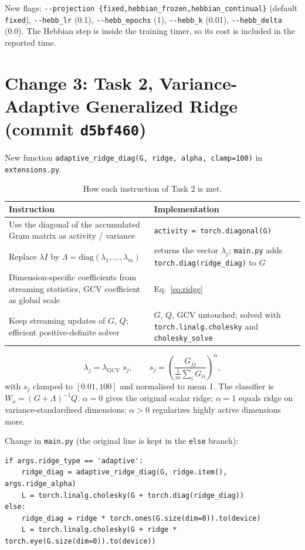 \documentclass[11pt,a4paper]{article}
\begin{document}
New flags: \texttt{-{}-projection \{fixed,hebbian\_frozen,hebbian\_continual\}} (default \texttt{fixed}),
\texttt{-{}-hebb\_lr} (0.1), \texttt{-{}-hebb\_epochs} (1), \texttt{-{}-hebb\_k} (0.01),
\texttt{-{}-hebb\_delta} (0.0).
The Hebbian step is inside the training timer, so its cost is included in the reported time.

\section{Change 3: Task 2, Variance-Adaptive Generalized Ridge (commit \texttt{d5bf460})}

New function \texttt{adaptive\_ridge\_diag(G, ridge, alpha, clamp=100)} in \texttt{extensions.py}.

\begin{table}[h]
\centering
\caption{How each instruction of Task 2 is met.}
\begin{tabularx}{\textwidth}{LL}
\toprule
Instruction & Implementation \\
\midrule
Use the diagonal of the accumulated Gram matrix as activity / variance &
\texttt{activity = torch.diagonal(G)} \\
Replace $\lambda I$ by $\Lambda = \mathrm{diag}(\lambda_1,\dots,\lambda_m)$ &
returns the vector $\lambda_j$; \texttt{main.py} adds \texttt{torch.diag(ridge\_diag)} to $G$ \\
Dimension-specific coefficients from streaming statistics, GCV coefficient as global scale &
Eq.~\eqref{eq:ridge} \\
Keep streaming updates of $G$, $Q$; efficient positive-definite solver &
$G$, $Q$, GCV untouched; solved with \texttt{torch.linalg.cholesky} and \texttt{cholesky\_solve} \\
\bottomrule
\end{tabularx}
\end{table}

\begin{equation}
\lambda_j = \lambda_{\mathrm{GCV}}\; s_j,
\qquad
s_j = \left(\frac{G_{jj}}{\tfrac{1}{m}\sum_i G_{ii}}\right)^{\alpha},
\label{eq:ridge}
\end{equation}
with $s_j$ clamped to $[0.01, 100]$ and normalised to mean 1. The classifier is
$W_o = (G + \Lambda)^{-1} Q$.
$\alpha = 0$ gives the original scalar ridge; $\alpha = 1$ equals ridge on variance-standardised
dimensions; $\alpha > 0$ regularizes highly active dimensions more.

Change in \texttt{main.py} (the original line is kept in the \texttt{else} branch):
\begin{verbatim}
if args.ridge_type == 'adaptive':
    ridge_diag = adaptive_ridge_diag(G, ridge.item(), args.ridge_alpha)
    L = torch.linalg.cholesky(G + torch.diag(ridge_diag))
else:
    ridge_diag = ridge * torch.ones(G.size(dim=0)).to(device)
    L = torch.linalg.cholesky(G + ridge * torch.eye(G.size(dim=0)).to(device))
\end{verbatim}
\end{document}

